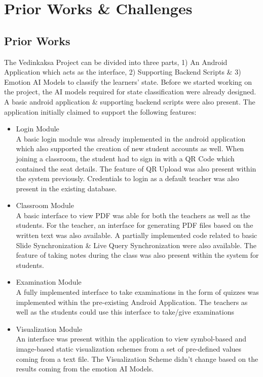 \documentclass[10pt]{report}
\begin{document}
\chapter{Prior Works \& Challenges}
\section{Prior Works}
The Vedinkaksa Project can be divided into three parts, 1) An Android Application which acts as the interface, 2) Supporting Backend Scripts \& 3) Emotion AI Models to classify the learners' state. Before we started working on the project, the AI models required for state classification were already designed. A basic android application \& supporting backend scripts were also present. The application initially claimed to support the following features:
\begin{itemize}
\item{Login Module \\ A basic login module was already implemented in the android application which also supported the creation of new student accounts as well. When joining a classroom, the student had to sign in with a QR Code which contained the seat details. The feature of QR Upload was also present within the system previously. Credentials to login as a default teacher was also present in the existing database.}
\item{Classroom Module \\ A basic interface to view PDF was able for both the teachers as well as the students. For the teacher, an interface for generating PDF files based on the written text was also available. A partially implemented code related to basic Slide Synchronization \& Live Query Synchronization were also available. The feature of taking notes during the class was also present within the system for students.}
\item{Examination Module \\ A fully implemented interface to take examinations in the form of quizzes was implemented within the pre-existing Android Application. The teachers as well as the students could use this interface to take/give examinations}
\item{Visualization Module \\ An interface was present within the application to view symbol-based and image-based static visualization schemes from a set of pre-defined values coming from a text file. The Visualization Scheme didn't change based on the results coming from the emotion AI Models.} 
\end{itemize} 
\end{document}

